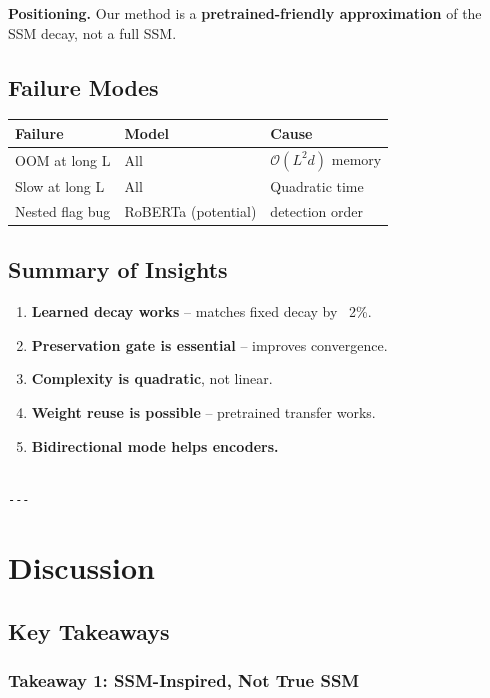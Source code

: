 \textbf{Positioning.} Our method is a \textbf{pretrained-friendly approximation} of 
the SSM decay, not a full SSM.

\subsection{Failure Modes}

\begin{table}[H]
\centering
\small
\begin{tabular}{lll}
\toprule
\textbf{Failure} & \textbf{Model} & \textbf{Cause} \\
\midrule
OOM at long L & All & $\mathcal{O}(L^2 d)$ memory \\
Slow at long L & All & Quadratic time \\
Nested flag bug & RoBERTa (potential) & detection order \\
\bottomrule
\end{tabular}
\end{table}

\subsection{Summary of Insights}

\begin{enumerate}
\item \textbf{Learned decay works} -- matches fixed decay by ~2\%.
\item \textbf{Preservation gate is essential} -- improves convergence.
\item \textbf{Complexity is quadratic}, not linear.
\item \textbf{Weight reuse is possible} -- pretrained transfer works.
\item \textbf{Bidirectional mode helps encoders.}
\end{enumerate}
\begin{lstlisting}

---
\end{lstlisting}

\section{Discussion}

\subsection{Key Takeaways}

\subsubsection{Takeaway 1: SSM-Inspired, Not True SSM}

